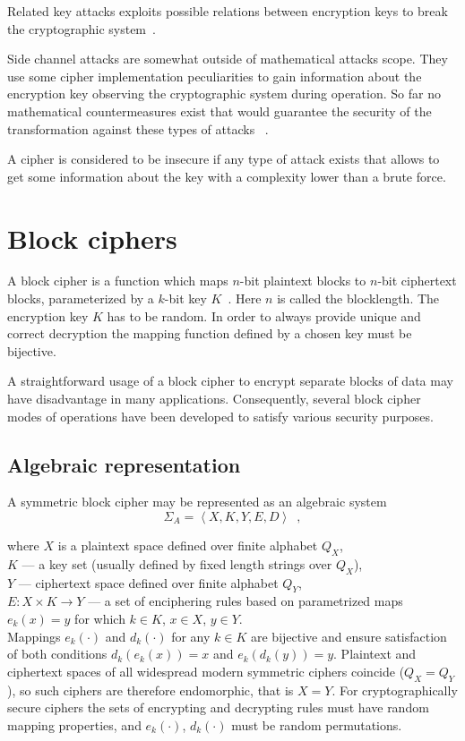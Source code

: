 Related key attacks exploits possible relations between encryption keys to
break the cryptographic system~\cite{StampLow:AppliedCryptanalysis}.

Side channel attacks are somewhat outside of mathematical attacks scope. They
use some cipher implementation peculiarities to gain information about the
encryption key observing the cryptographic system during operation. So far no
mathematical countermeasures exist that would guarantee the security of the
transformation against these types of attacks ~\cite{Quisquater:sidechannel}.

A cipher is considered to be insecure if any type of attack exists that allows
to get some information about the key with a complexity lower than a brute
force. 

\section{Block ciphers}

A block cipher is a function which maps $n$-bit plaintext blocks to $n$-bit 
ciphertext blocks, parameterized by a $k$-bit key
$K$~\cite{menezes:applied_cryptography}. Here $n$ is called the blocklength.
The encryption key $K$ has to be random. In order to always provide unique and
correct decryption the mapping function defined by a chosen key must be
bijective.

A straightforward usage of a block cipher to encrypt separate blocks of data may have
disadvantage in many applications. Consequently, several block cipher modes of
operations have been developed to satisfy various security purposes.

\subsection{Algebraic representation}
\label{sec:block-algebraic}

A symmetric block cipher may be represented as an algebraic
system~\cite{babash:cryptography}
\begin{equation}
\label{eqn:block-algebraic}
\Sigma_{A} = \left< X, K, Y, E, D \right> \enspace, 
\end{equation}

    where $X$ is a plaintext space defined over finite alphabet $Q_X$, \\ 
$K$ --- a key set (usually defined by fixed length strings over $Q_X$), \\
$Y$ --- ciphertext space defined over finite alphabet $Q_Y$, \\
$E: X \times K \rightarrow Y$ --- a set of enciphering rules based on
parametrized maps $e_k(x) = y$ for which $k \in K$, $x \in X$, $y \in Y$. \\
Mappings $e_k(\cdot)$ and $d_k(\cdot)$ for any $k \in K$  are bijective and
ensure satisfaction of both conditions $d_k(e_k(x)) = x$ and $e_k(d_k(y)) = y$.
Plaintext and ciphertext spaces of all widespread modern symmetric ciphers 
coincide ($Q_X = Q_Y$), so such ciphers are therefore endomorphic, that is 
\mbox{$X = Y$}.
For cryptographically secure ciphers the sets of encrypting and decrypting
rules must have random mapping properties, and $e_k(\cdot)$, $d_k(\cdot)$ must
be random permutations.


